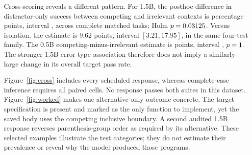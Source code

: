 \documentclass[10pt,a4paper,twocolumn]{article}
\begin{document}
Cross-scoring reveals a different pattern. For 1.5B, the posthoc difference in
distractor-only success between competing and irrelevant contexts is
\LargeCross{} percentage points, interval \LargeCrossCI{}, across
\LargeCrossN{} complete matched tasks; Holm $p=0.03125{}$. Versus
isolation, the estimate is 9.62 points, interval $[3.21,17.95]$, in the same
four-test family. The 0.5B competing-minus-irrelevant estimate is
\SmallCross{} points, interval \SmallCrossCI{}, $p=1{}$.
The stronger 1.5B error-type association therefore does not imply a similarly
large change in its overall target pass rate.

Figure~\ref{fig:cross} includes every scheduled response, whereas complete-case
inference requires all paired cells. No response passes both suites in this
dataset. Figure~\ref{fig:worked} makes one alternative-only outcome concrete.
The target specification is present and marked as the only function to implement,
yet the saved body uses the competing inclusive boundary. A second audited
1.5B response reverses parenthesis-group order as required by its alternative.
These selected examples illustrate the test categories; they do not estimate
their prevalence or reveal why the model produced those programs.
\end{document}
